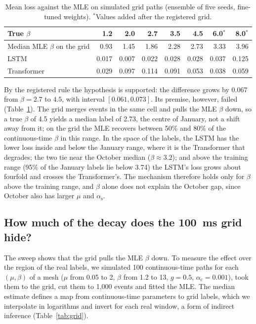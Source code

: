 \documentclass[preprint,12pt,authoryear]{elsarticle}
\newcommand{\aself}{\alpha_{\mathrm{s}}}
\newcommand{\across}{\alpha_{\mathrm{c}}}
\begin{document}
\begin{table}[t]
\centering
\caption{Mean loss against the MLE on simulated grid paths (ensemble of five seeds,
fine-tuned weights). $^{\ast}$Values added after the registered grid.}
\label{tab:beta}
\small
\setlength{\tabcolsep}{5pt}
\begin{tabular}{lrrrrrrr}
\toprule
True $\beta$ & 1.2 & 2.0 & 2.7 & 3.5 & 4.5 & 6.0$^{\ast}$ & 8.0$^{\ast}$\\
\midrule
Median MLE $\beta$ on the grid & 0.93 & 1.45 & 1.86 & 2.28 & 2.73 & 3.33 & 3.96\\
LSTM & 0.017 & 0.007 & 0.022 & 0.028 & 0.028 & 0.037 & 0.125\\
Transformer & 0.029 & 0.097 & 0.114 & 0.091 & 0.053 & 0.038 & 0.059\\
\bottomrule
\end{tabular}
\end{table}

By the registered rule the hypothesis is supported: the difference grows by 0.067 from
$\beta=2.7$ to $4.5$, with interval $[0.061,0.073]$. Its premise, however, failed
(Table~\ref{tab:beta}). The grid merges events in the same cell and pulls the MLE $\beta$
down, so a true $\beta$ of 4.5 yields a median label of 2.73, the centre of January, not a
shift away from it; on the grid the MLE recovers between 50\% and 80\% of the
continuous-time $\beta$ in this range. In the space of the labels, the LSTM has the lower loss inside and below the January range, where it is the
Transformer that degrades; the two tie near the October median ($\beta\approx3.2$); and above
the training range (95\% of the January labels lie below 3.74) the LSTM's loss grows about
fourfold and crosses the Transformer's. The mechanism therefore holds only for $\beta$ above
the training range, and $\beta$ alone does not explain the October gap, since October also
has larger $\mu$ and $\aself$.

\subsection{How much of the decay does the 100~ms grid hide?}
\label{sec:grid}

The sweep shows that the grid pulls the MLE $\beta$ down. To measure the effect over the
region of the real labels, we simulated 100 continuous-time paths for each $(\mu,\beta)$ of a
mesh ($\mu$ from 0.05 to 2, $\beta$ from 1.2 to 13, $g=0.5$, $\across=0.001$), took them to the
grid, cut them to 1,000 events and fitted the MLE. The median estimate defines a map from
continuous-time parameters to grid labels, which we interpolate in logarithms and invert for
each real window, a form of indirect inference (Table~\ref{tab:grid}).
\end{document}
